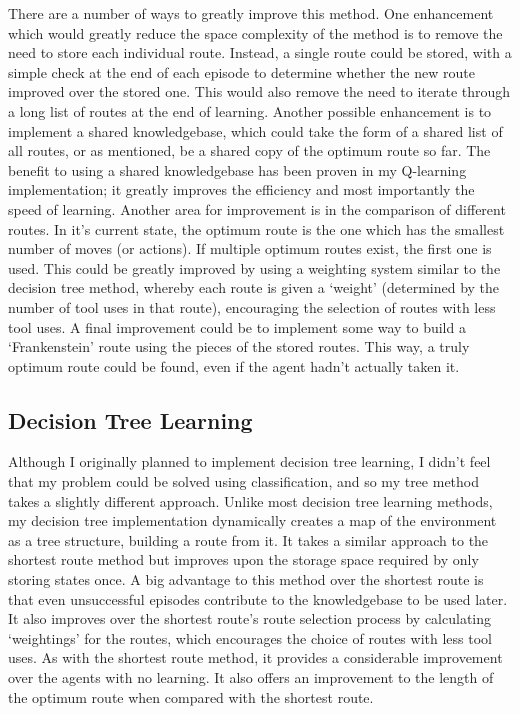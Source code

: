 \documentclass[a4paper,oneside]{report}
\begin{document}
There are a number of ways to greatly improve this method. One enhancement which would greatly reduce the space complexity of the method is to remove the need to store each individual route. Instead, a single route could be stored, with a simple check at the end of each episode to determine whether the new route improved over the stored one. This would also remove the need to iterate through a long list of routes at the end of learning. Another possible enhancement is to implement a shared knowledgebase, which could take the form of a shared list of all routes, or as mentioned, be a shared copy of the optimum route so far. The benefit to using a shared knowledgebase has been proven in my Q-learning implementation; it greatly improves the efficiency and most importantly the speed of learning. Another area for improvement is in the comparison of different routes. In it's current state, the optimum route is the one which has the smallest number of moves (or actions). If multiple optimum routes exist, the first one is used. This could be greatly improved by using a weighting system similar to the decision tree method, whereby each route is given a `weight' (determined by the number of tool uses in that route), encouraging the selection of routes with less tool uses. A final improvement could be to implement some way to build a `Frankenstein' route using the pieces of the stored routes. This way, a truly optimum route could be found, even if the agent hadn't actually taken it.

\subsection{Decision Tree Learning}

Although I originally planned to implement decision tree learning, I didn't feel that my problem could be solved using classification, and so my tree method takes a slightly different approach. Unlike most decision tree learning methods, my decision tree implementation dynamically creates a map of the environment as a tree structure, building a route from it. It takes a similar approach to the shortest route method but improves upon the storage space required by only storing states once. A big advantage to this method over the shortest route is that even unsuccessful episodes contribute to the knowledgebase to be used later. It also improves over the shortest route's route selection process by calculating `weightings' for the routes, which encourages the choice of routes with less tool uses. As with the shortest route method, it provides a considerable improvement over the agents with no learning. It also offers an improvement to the length of the optimum route when compared with the shortest route. 
\end{document}
